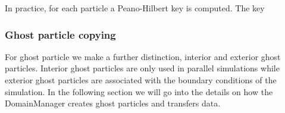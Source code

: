 In practice, for each particle a Peano-Hilbert key is computed. The key

\subsubsection{Ghost particle copying}
For ghost particle we make a further distinction, interior and exterior ghost particles.
Interior ghost particles are only used in parallel simulations while exterior ghost
particles are associated with the boundary conditions of the simulation. In the following
section we will go into the details on how the DomainManager creates ghost particles
and transfers data.
